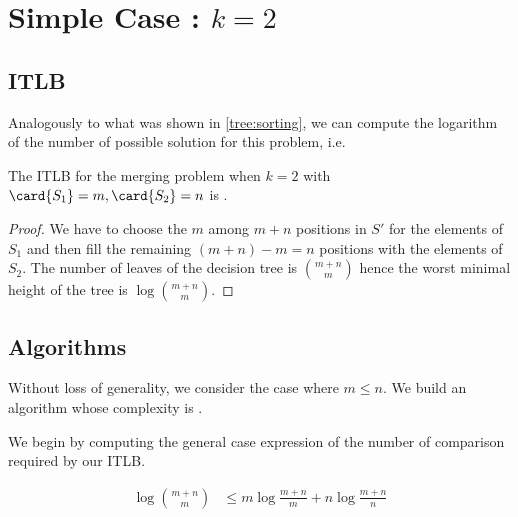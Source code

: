 \section{Simple Case : $k=2$}
\label{tree:merging:k=2}

\subsection{ITLB}
\label{tree:merging:k=2:ITLB}

Analogously to what was shown in \ref{tree:sorting}, we can compute the
logarithm of the number of possible solution for this problem, i.e.

\begin{theorem}
The ITLB for the merging problem when $k = 2$ with $\card{S_1} = m, \card{S_2}
= n$ is .
\end{theorem}

\begin{proof}
We have to choose the $m$ among $m+n$ positions in $S'$ for the elements of
$S_1$ and then fill the remaining $(m+n) - m = n$ positions with the elements
of $S_2$. The number of leaves of the decision tree is $\binom{m+n}{m}$ hence
the worst minimal height of the tree is $\log \binom{m+n}{m}$.
\end{proof}



\subsection{Algorithms}
\label{tree:merging:k=2:alg}

Without loss of generality, we consider the case where $m \leq n$. We build an
algorithm whose complexity is .


We begin by computing the general case expression of the number of comparison
required by our ITLB.


\begin{lemma}
\begin{align*}
\log\binom{m+n}{m} &\leq m \log\frac{m+n}{m} + n \log\frac{m+n}{n}\\
\end{align*}
\end{lemma}

